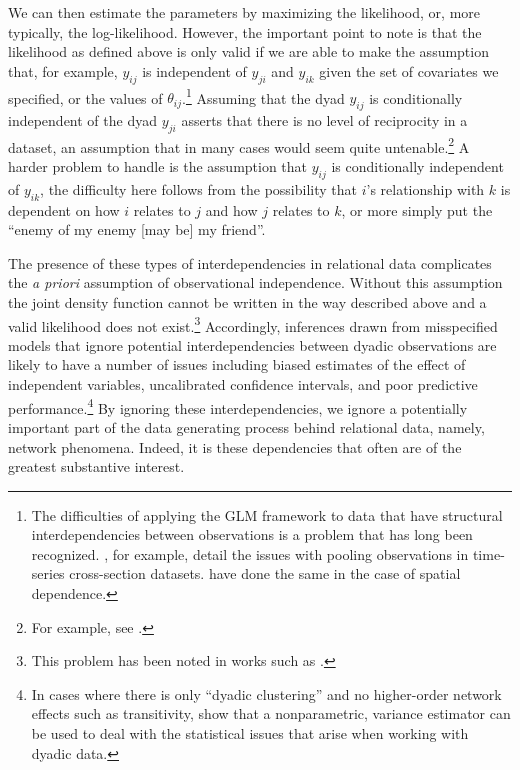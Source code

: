 \documentclass[12pt,onesided,pdflatex]{amsart}
\begin{document}
We can then estimate the parameters by maximizing the likelihood, or, more typically, the log-likelihood. However, the important point to note is that the likelihood as defined above is only valid if we are able to make the assumption that, for example, $y_{ij}$ is independent of $y_{ji}$ and $y_{ik}$ given the set of covariates we specified, or the values of $\theta_{ij}$.\footnote{The difficulties of applying the GLM framework to data that have structural interdependencies between observations is a problem that has long been recognized. \citet{beck:katz:1995}, for example, detail the issues with pooling observations in time-series cross-section datasets. \citet{ward:gleditsch:2008} have done the same in the case of spatial dependence.} Assuming that the dyad $y_{ij}$ is conditionally independent of the dyad $y_{ji}$ asserts that there is no level of reciprocity in a dataset, an assumption that in many cases would seem quite untenable.\footnote{For example, see \citet{ward:etal:2007,cranmer:2014,dorff:minhas:2016}.} A harder problem to handle is the assumption that $y_{ij}$ is conditionally independent of $y_{ik}$, the difficulty here follows from the possibility that $i$'s relationship with $k$ is dependent on how $i$ relates to $j$ and how $j$ relates to $k$, or more simply put the ``enemy of my enemy [may be] my friend''. 

The presence of these types of interdependencies in relational data complicates the \textit{a priori} assumption of observational independence. Without this assumption the joint density function cannot be written in the way described above and  a valid likelihood does not exist.\footnote{This problem has been noted in works such as \citet{lai:1995,manger:etal:2012,kinne:2013}.} Accordingly, inferences drawn from misspecified models that ignore potential interdependencies between dyadic observations are likely to have a number of issues including biased estimates of the effect of independent variables, uncalibrated confidence intervals, and poor predictive performance.\footnote{In cases where there is only ``dyadic clustering'' and no higher-order network effects such as transitivity, \citet{aronow:etal:2015} show that a nonparametric, variance estimator can be used to deal with the statistical issues that arise when working with dyadic data.} By ignoring these interdependencies, we ignore a potentially important part of the data generating process behind relational data, namely, network phenomena. Indeed, it is these dependencies that often are of the greatest substantive interest. 
\end{document}
